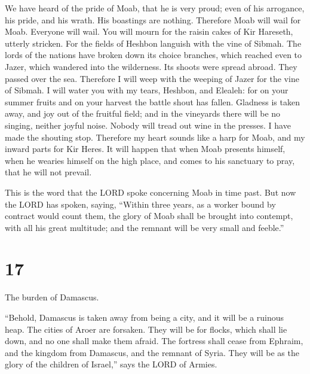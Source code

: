  We have heard of the pride of Moab, that he is very proud;
even of his arrogance, his pride, and his wrath. His boastings are
nothing.  Therefore Moab will wail for Moab. Everyone will
wail. You will mourn for the raisin cakes of Kir Hareseth, utterly
stricken.  For the fields of Heshbon languish with the vine
of Sibmah. The lords of the nations have broken down its choice
branches, which reached even to Jazer, which wandered into the
wilderness. Its shoots were spread abroad. They passed over the sea.
 Therefore I will weep with the weeping of Jazer for the
vine of Sibmah. I will water you with my tears, Heshbon, and Elealeh:
for on your summer fruits and on your harvest the battle shout has
fallen.  Gladness is taken away, and joy out of the
fruitful field; and in the vineyards there will be no singing, neither
joyful noise. Nobody will tread out wine in the presses. I have made the
shouting stop.  Therefore my heart sounds like a harp for
Moab, and my inward parts for Kir Heres.  It will happen
that when Moab presents himself, when he wearies himself on the high
place, and comes to his sanctuary to pray, that he will not prevail.

 This is the word that the LORD spoke concerning Moab in
time past.  But now the LORD has spoken, saying, ``Within
three years, as a worker bound by contract would count them, the glory
of Moab shall be brought into contempt, with all his great multitude;
and the remnant will be very small and feeble.''

\hypertarget{section-16}{%
\section{17}\label{section-16}}

 The burden of Damascus.

``Behold, Damascus is taken away from being a city, and it will be a
ruinous heap.  The cities of Aroer are forsaken. They will
be for flocks, which shall lie down, and no one shall make them afraid.
 The fortress shall cease from Ephraim, and the kingdom from
Damascus, and the remnant of Syria. They will be as the glory of the
children of Israel,'' says the LORD of Armies.

